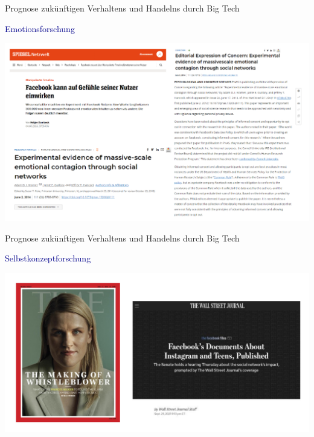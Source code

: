 \documentclass[
  8pt,
  ignorenonframetext,
]{beamer}
\begin{document}
\begin{frame}{Prognose zukünftigen Verhaltens und Handelns durch Big
Tech}
\protect\hypertarget{prognose-zukuxfcnftigen-verhaltens-und-handelns-durch-big-tech-1}{}
\vfill

\textcolor{darkblue}{Emotionsforschung}

\begin{center}\includegraphics[width=1\linewidth]{2_Abbildungen/pfm_2_bigtech_facebook_experiment} \end{center}
\vfill
\end{frame}

\begin{frame}{Prognose zukünftigen Verhaltens und Handelns durch Big
Tech}
\protect\hypertarget{prognose-zukuxfcnftigen-verhaltens-und-handelns-durch-big-tech-2}{}
\vfill

\textcolor{darkblue}{Selbstkonzeptforschung}

\begin{center}\includegraphics[width=1\linewidth]{2_Abbildungen/pfm_2_bigtech_facebook_files} \end{center}
\vfill
\end{frame}
\end{document}
